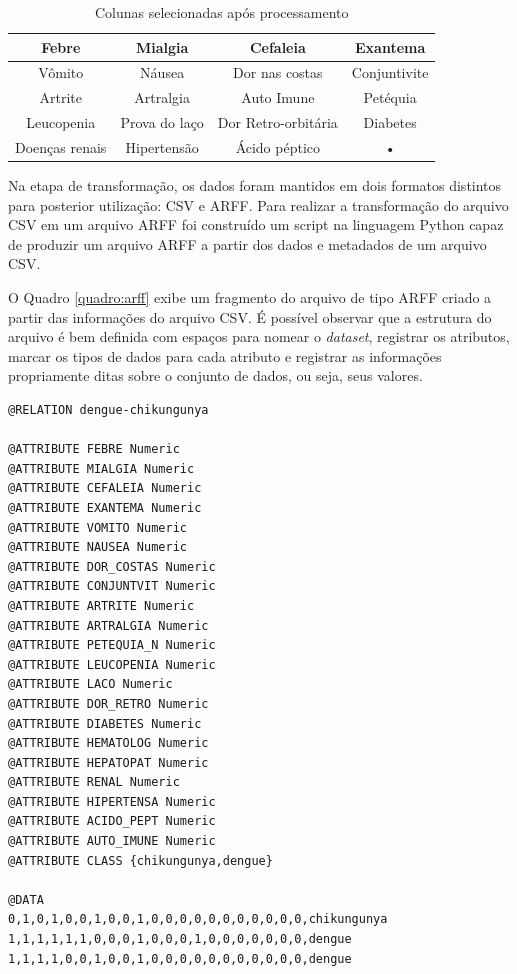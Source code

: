 \begin{table}[h]
\begin{center}
\caption{\label{tab:21colunas}Colunas selecionadas após processamento}

\begin{tabular}{c|c|c|c}
\hline 
Febre & Mialgia & Cefaleia & Exantema \\ 
\hline 
Vômito & Náusea & Dor nas costas & Conjuntivite \\ 
\hline 
Artrite & Artralgia & Auto Imune & Petéquia \\ 
\hline 
Leucopenia & Prova do laço & Dor Retro-orbitária & Diabetes \\ 
\hline 
Doenças renais & Hipertensão & Ácido péptico & • \\ 
\hline 
\end{tabular} 

\end{center}
\end{table}
\newpage

Na etapa  de transformação, os dados foram mantidos em dois formatos distintos para posterior utilização: CSV e ARFF. Para realizar a transformação do arquivo CSV em um arquivo ARFF foi construído um script na linguagem Python capaz de produzir um arquivo ARFF a partir dos dados e metadados de um arquivo CSV.

O Quadro \ref{quadro:arff} exibe um fragmento do arquivo de tipo ARFF criado a partir das informações do arquivo CSV. É possível observar que a estrutura do arquivo é bem definida com espaços para nomear o \textit{dataset}, registrar os atributos, marcar os tipos de dados para cada atributo e registrar as informações propriamente ditas sobre o conjunto de dados, ou seja, seus valores.

\begin{quadro}
\caption{\label{quadro:arff}Fragmento do arquivo ARFF}
\begingroup
    \fontsize{10pt}{9pt}\selectfont
    \begin{verbatim}  
@RELATION dengue-chikungunya

@ATTRIBUTE FEBRE Numeric
@ATTRIBUTE MIALGIA Numeric
@ATTRIBUTE CEFALEIA Numeric
@ATTRIBUTE EXANTEMA Numeric
@ATTRIBUTE VOMITO Numeric
@ATTRIBUTE NAUSEA Numeric
@ATTRIBUTE DOR_COSTAS Numeric
@ATTRIBUTE CONJUNTVIT Numeric
@ATTRIBUTE ARTRITE Numeric
@ATTRIBUTE ARTRALGIA Numeric
@ATTRIBUTE PETEQUIA_N Numeric
@ATTRIBUTE LEUCOPENIA Numeric
@ATTRIBUTE LACO Numeric
@ATTRIBUTE DOR_RETRO Numeric
@ATTRIBUTE DIABETES Numeric
@ATTRIBUTE HEMATOLOG Numeric
@ATTRIBUTE HEPATOPAT Numeric
@ATTRIBUTE RENAL Numeric
@ATTRIBUTE HIPERTENSA Numeric
@ATTRIBUTE ACIDO_PEPT Numeric
@ATTRIBUTE AUTO_IMUNE Numeric
@ATTRIBUTE CLASS {chikungunya,dengue}

@DATA
0,1,0,1,0,0,1,0,0,1,0,0,0,0,0,0,0,0,0,0,0,chikungunya
1,1,1,1,1,1,0,0,0,1,0,0,0,1,0,0,0,0,0,0,0,dengue
1,1,1,1,0,0,1,0,0,1,0,0,0,0,0,0,0,0,0,0,0,dengue
    \end{verbatim}  
\endgroup
{}
\end{quadro}
\newpage

